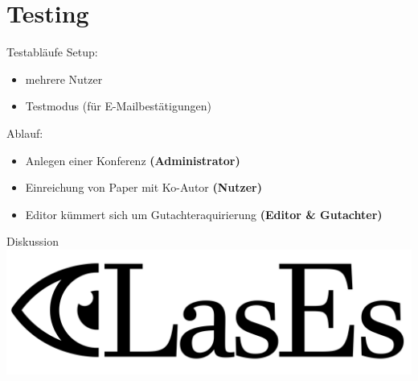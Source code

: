 \documentclass{beamer}
\begin{document}


        \section{Testing}
        \begin{frame}{Testabläufe}
            \pause
            Setup:
            \begin{itemize}
                \item mehrere Nutzer
                \item Testmodus (für E-Mailbestätigungen)
            \end{itemize}

            \pause

            Ablauf:
            \begin{itemize}
                \item Anlegen einer Konferenz \textbf{(Administrator)}
                \item Einreichung von Paper mit Ko-Autor \textbf{(Nutzer)}
                \item Editor kümmert sich um Gutachteraquirierung \textbf{(Editor \& Gutachter)}
            \end{itemize}
        \end{frame}

        \begin{frame}{Diskussion}
            \centering
            \includegraphics[width=0.7\linewidth]{../../docs/Pflichtenheft/graphics/LasEs-logo}
        \end{frame}

    
\end{document}
